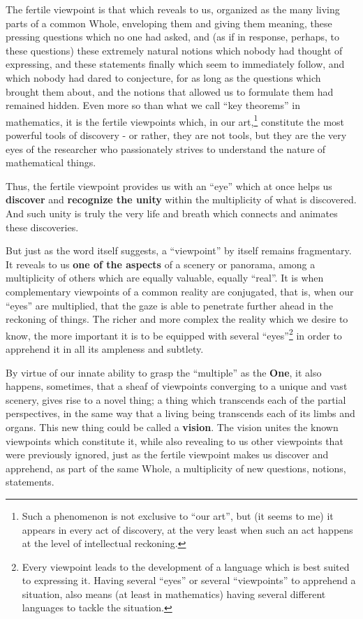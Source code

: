 The fertile viewpoint is that which reveals to us, organized as the many living parts of a
common Whole, 
enveloping them and giving them meaning, these pressing questions which no one had asked,
and (as if in response, perhaps, to these questions) these extremely natural notions which
nobody had thought of expressing, and these statements finally which seem to immediately
follow, and which nobody had dared to conjecture, for as long as the questions which
brought them about, and the notions that allowed us to formulate them had remained hidden.
Even more so than what we call ``key theorems'' in mathematics, it is the fertile viewpoints which, in our art,\footnote{Such a phenomenon is not exclusive to ``our art'', but (it
seems to me) it appears in every act of discovery, at the very least when such an act
happens at the level of intellectual reckoning.}  constitute the most powerful tools of discovery - or rather, they are not tools, but they are the very eyes of the researcher who passionately strives to understand the nature of mathematical things. 

Thus, the fertile viewpoint provides us with an ``eye'' which at once helps us \textbf{discover} and \textbf{recognize the unity} within the multiplicity of what is discovered. And such unity is truly the very life and breath which connects and animates these discoveries.

But just as the word itself suggests, a ``viewpoint'' by itself remains fragmentary. 
It reveals to us \textbf{one of the aspects}
of a scenery or panorama, among a multiplicity of others which are equally valuable,
equally ``real''. It is when complementary viewpoints of a common reality 
are conjugated, that is, when our ``eyes'' are multiplied, that the gaze is able to
penetrate further ahead in the reckoning of things. 
The richer and more complex the reality which we desire to know, the more important it is
to be equipped with several ``eyes''\footnote{Every viewpoint leads to the development of
a language which is best suited to expressing it. Having several ``eyes'' or several
``viewpoints'' to apprehend a situation, also means (at least in mathematics) having 
several different languages to tackle the situation.} in order to apprehend it in all its ampleness and
subtlety. 

By virtue of our innate ability to grasp the ``multiple'' as the \textbf{One},
it also happens, sometimes, that a sheaf of viewpoints 
converging to a unique and vast scenery, gives rise to a novel thing; a thing which
transcends each of the partial perspectives, in the same way that a living being
transcends
each of its limbs and organs. This new thing could be called a \textbf{vision}.
The vision unites the known viewpoints which constitute it, while also revealing to us
other viewpoints that were previously ignored, just as the fertile viewpoint makes us
discover and apprehend, as part of the same Whole, a multiplicity of new questions,
notions, statements. 

